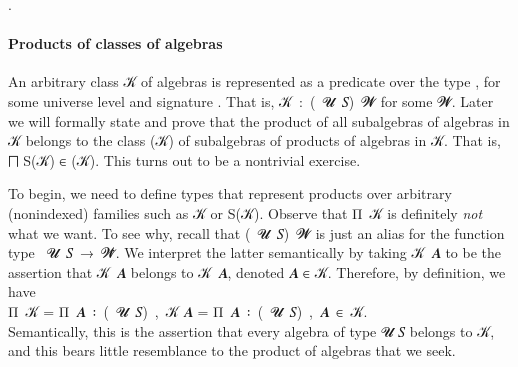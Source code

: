 \AgdaSpace{}%
\AgdaSymbol{:=}\AgdaSpace{}%
\AgdaSpace{}%
\AgdaSpace{}%
\AgdaSpace{}%
\AgdaSpace{}%
\AgdaSpace{}%
.


\paragraph*{Products of classes of algebras}\label{products-of-classes-of-algebras}

An arbitrary class \ab 𝒦 of algebras is represented as a predicate over the type \AgdaSpace{}\AgdaSpace{}, for some universe level  and signature .
That is, \ab 𝒦~\as :~(~\ab 𝓤~\ab 𝑆)~𝓦 for some 𝓦.
Later we will formally state and prove that the product of all subalgebras of algebras in \ab 𝒦  belongs to the class (\ab 𝒦) of subalgebras of products of algebras in \ab 𝒦. That is, \af ⨅ \af S(\ab 𝒦) \af ∈ (\ab 𝒦). This turns out to be a nontrivial exercise.

To begin, we need to define types that represent products over arbitrary (nonindexed) families such as \ab 𝒦 or \af S(\ab 𝒦). Observe that \ad Π~\ab 𝒦 is definitely \emph{not} what we want.  To see why, recall that (~\ab 𝓤~\ab 𝑆)~\ab 𝓦 is just an alias for the function type ~\ab 𝓤~\ab 𝑆~\as →~\ab 𝓦\af ̇. We interpret the latter semantically by taking \ab 𝒦~\ab 𝑨 to be the assertion that \ab 𝒦~\ab 𝑨 belongs to \ab 𝒦~\ab 𝑨, denoted \ab 𝑨 ∈ \ab 𝒦. Therefore, by definition, we have\\[-10pt]

\ad Π~\ab 𝒦 \hskip1mm = \hskip1mm \ad Π~\ab 𝑨~\af ꞉~(~\ab 𝓤~\ab 𝑆)~,~\ab 𝒦 𝑨
             \hskip1mm = \hskip1mm\ad Π~\ab 𝑨~\af ꞉~(~\ab 𝓤~\ab 𝑆)~,~\ab 𝑨~\af ∈~\ab 𝒦.\\[4pt]
Semantically, this is the assertion that every algebra of type  \ab 𝓤 \ab 𝑆 belongs to \ab 𝒦, and this bears little resemblance to the product of algebras that we seek.

